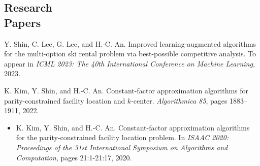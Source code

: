 \documentclass[margin, 10pt]{res} %
\begin{document}
\begin{resume}

\section{Research \\ Papers}
Y. Shin, C. Lee, G. Lee, and H.-C. An. Improved learning-augmented algorithms for the multi-option ski rental problem via best-possible competitive analysis. To appear in \emph{ICML 2023: The 40th International Conference on Machine Learning}, 2023.

K. Kim, Y. Shin, and H.-C. An. Constant-factor approximation algorithms for parity-constrained facility location and $k$-center. \emph{Algorithmica 85}, pages 1883–1911, 2022.
\begin{itemize} %
\item[] K. Kim, Y. Shin, and H.-C. An. Constant-factor approximation algorithms for the parity-constrained facility location problem. In \emph{ISAAC 2020: Proceedings of the 31st International Symposium on Algorithms and Computation}, pages 21:1-21:17, 2020.
\end{itemize}


\end{resume}
\end{document}
